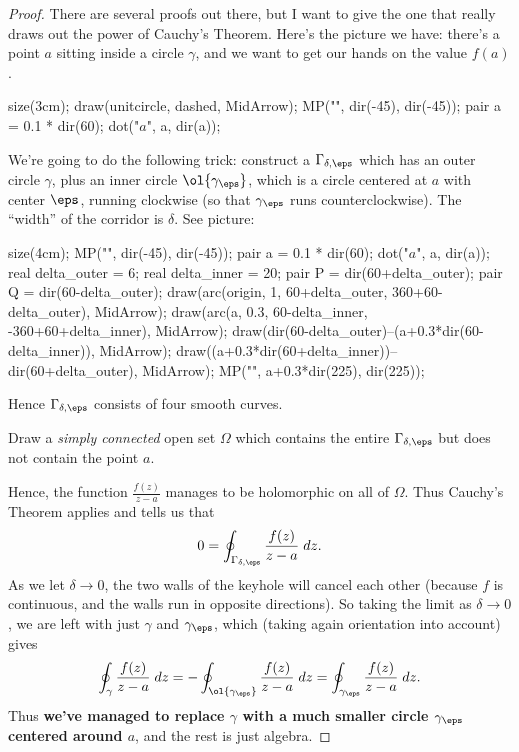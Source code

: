 \begin{proof}
	There are several proofs out there, but I want to give the one that really
	draws out the power of Cauchy's Theorem. Here's the picture we have:
	there's a point $a$ sitting inside a circle $\gamma$,
	and we want to get our hands on the value $f(a)$.
	\begin{center}
		\begin{asy}
			size(3cm);
			draw(unitcircle, dashed, MidArrow);
			MP("\gamma", dir(-45), dir(-45));
			pair a = 0.1 * dir(60);
			dot("$a$", a, dir(a));
		\end{asy}
	\end{center}
	We're going to do the following trick: construct a  $\Gamma_{\delta, \eps}$
	which has an outer circle $\gamma$, plus an inner circle $\ol{\gamma_\eps}$, which is a circle centered
	at $a$ with center $\eps$, running clockwise (so that $\gamma_\eps$ runs counterclockwise).
	The ``width'' of the corridor is $\delta$. See picture:
	\begin{center}
		\begin{asy}
			size(4cm);
			MP("\gamma", dir(-45), dir(-45));
			pair a = 0.1 * dir(60);
			dot("$a$", a, dir(a));
			real delta_outer = 6;
			real delta_inner = 20;
			pair P = dir(60+delta_outer);
			pair Q = dir(60-delta_outer);
			draw(arc(origin, 1, 60+delta_outer, 360+60-delta_outer), MidArrow);
			draw(arc(a, 0.3, 60-delta_inner, -360+60+delta_inner), MidArrow);
			draw(dir(60-delta_outer)--(a+0.3*dir(60-delta_inner)), MidArrow);
			draw((a+0.3*dir(60+delta_inner))--dir(60+delta_outer), MidArrow);
			MP("\overline{\gamma_\varepsilon}", a+0.3*dir(225), dir(225));
		\end{asy}
	\end{center}
	Hence $\Gamma_{\delta,\eps}$ consists of four smooth curves.
	\begin{ques}
		Draw a \emph{simply connected} open set $\Omega$ which contains the entire
		$\Gamma_{\delta,\eps}$ but does not contain the point $a$.
	\end{ques}
	Hence, the function $\frac{f(z)}{z-a}$ manages to be holomorphic on all of $\Omega$.
	Thus Cauchy's Theorem applies and tells us that
	\[
		0 = \oint_{\Gamma_{\delta,\eps}} \frac{f(z)}{z-a} \; dz.
	\]
	As we let $\delta \to 0$, the two walls of the keyhole will cancel each other (because $f$ is continuous,
	and the walls run in opposite directions).
	So taking the limit as $\delta \to 0$, we are left with just $\gamma$ and $\gamma_\eps$, 
	which (taking again orientation into account) gives
	\[
		\oint_{\gamma} \frac{f(z)}{z-a} \; dz
		= - \oint_{\ol{\gamma_\eps}} \frac{f(z)}{z-a} \; dz
		= \oint_{\gamma_\eps} \frac{f(z)}{z-a} \; dz.
	\]
	Thus \textbf{we've managed to replace $\gamma$ with a much smaller circle $\gamma_\eps$ centered around $a$},
	and the rest is just algebra.


\end{proof}
